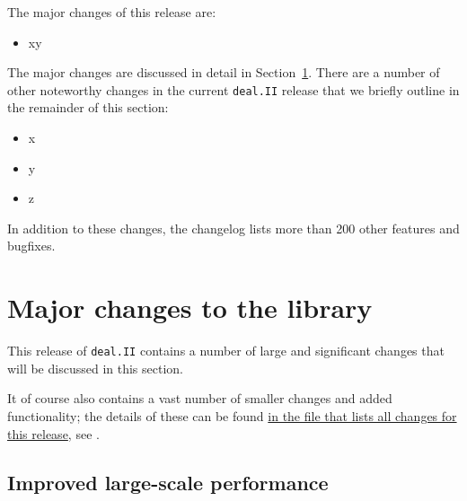 \documentclass{ansarticle-preprint}
\newcommand{\specialword}[1]{\texttt{#1}}
\newcommand{\dealii}{{\specialword{deal.II}}\xspace}
\begin{document}
The major changes of this release are:
%
\begin{itemize}
\item xy 
\end{itemize}
%
The major changes are discussed in detail in Section~\ref{sec:major}. There
are a number of other noteworthy changes in the current \dealii{} release
that we briefly outline in the remainder of this section:
%
\begin{itemize}
\item x 
\item y 
\item z 
\end{itemize}
%
In addition to these changes, the changelog lists more than 200 other
features and bugfixes.




\section{Major changes to the library}
\label{sec:major}

This release of \dealii contains a number of large and significant changes
that will be discussed in this section.

It of course also contains a
vast number of smaller changes and added functionality; the details of these
can be found
\href{https://dealii.org/developer/doxygen/deal.II/changes_between_9_0_1_and_9_1_0.html}{
in the file that lists all changes for this release}, see \cite{changes91}.


\subsection{Improved large-scale performance}
\label{subsec:performance}
\end{document}
